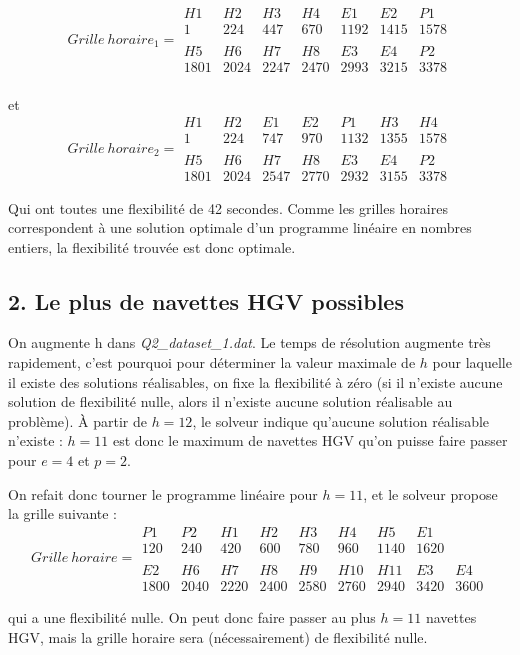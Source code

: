 \documentclass{rapport}
\begin{document}
\[Grille \  horaire_1 =
\begin{matrix}
H1 & H2 & H3 & H4 & E1 & E2 & P1 \\
1 & 224 & 447 & 670 & 1192 & 1415 & 1578 \\
\ \\
H5 & H6 & H7 & H8 & E3 & E4 & P2 \\
1801 & 2024 & 2247 & 2470 & 2993 & 3215 & 3378
\end{matrix}
\]
\ \\
et
\ \\
\[Grille \  horaire_2 =
\begin{matrix}
H1 & H2 & E1 & E2 & P1 & H3 & H4 \\
1 & 224 & 747 & 970 & 1132 & 1355 & 1578 \\
\ \\
H5 & H6 & H7 & H8 & E3 & E4 & P2 \\
1801 & 2024 & 2547 & 2770 & 2932 & 3155 & 3378
\end{matrix}
\]


Qui ont toutes une flexibilité de 42 secondes. Comme les grilles horaires correspondent à une solution optimale d'un programme linéaire en nombres entiers, la flexibilité trouvée est donc optimale.

\subsection{2. Le plus de navettes HGV possibles}
On augmente h dans \emph{Q2\_dataset\_1.dat}. Le temps de résolution augmente très rapidement, c'est pourquoi pour déterminer la valeur maximale de $h$ pour laquelle il existe des solutions réalisables, on fixe la flexibilité à zéro (si il n'existe aucune solution de flexibilité nulle, alors il n'existe aucune solution réalisable au problème).
À partir de $h=12$, le solveur indique qu'aucune solution réalisable n'existe : $h=11$ est donc le maximum de navettes HGV qu'on puisse faire passer pour $e=4$ et $p=2$.

On refait donc tourner le programme linéaire pour $h=11$, et le solveur propose la grille suivante : \\

\[Grille \  horaire =
\begin{matrix}
P1 & P2 & H1 & H2 & H3 & H4 & H5 & E1 \\
120 & 240 & 420 & 600 & 780 & 960 & 1140 & 1620\\
\ \\
E2 & H6 & H7 & H8 & H9 & H10 & H11 & E3 & E4 \\
1800 & 2040 & 2220 & 2400 & 2580 & 2760 & 2940 & 3420 & 3600
\end{matrix}
\]

qui a une flexibilité nulle. On peut donc faire passer au plus $h=11$ navettes HGV, mais la grille horaire sera (nécessairement) de flexibilité nulle.
\end{document}
